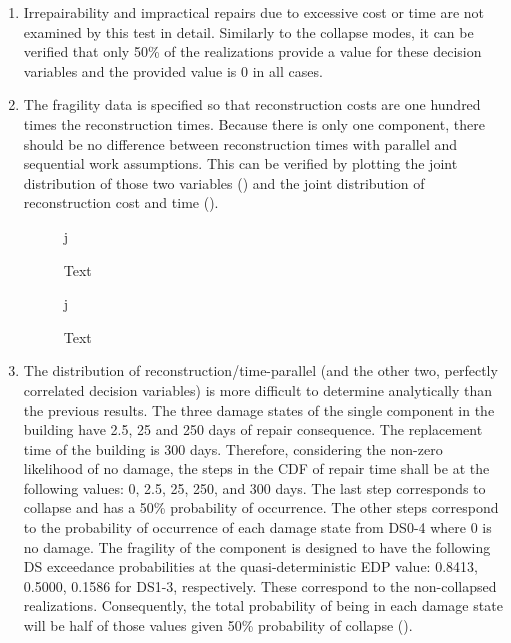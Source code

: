 \begin{enumerate}
    \item Irrepairability and impractical repairs due to excessive cost or time are not examined by this test in detail. Similarly to the collapse modes, it can be verified that only 50\% of the realizations provide a value for these decision variables and the provided value is 0 in all cases.
    \item The fragility data is specified so that reconstruction costs are one hundred times the reconstruction times. Because there is only one component, there should be no difference between reconstruction times with parallel and sequential work assumptions. This can be verified by plotting the joint distribution of those two variables () and the joint distribution of reconstruction cost and time ().
    
\begin{figure}[!htbp]j
  \caption{Text}
  \label{fig:ver_1_8}
\end{figure}

\begin{figure}[!htbp]j
  \caption{Text}
  \label{fig:ver_1_9}
\end{figure}

    \item The distribution of reconstruction/time-parallel (and the other two, perfectly correlated decision variables) is more difficult to determine analytically than the previous results. The three damage states of the single component in the building have 2.5, 25 and 250 days of repair consequence. The replacement time of the building is 300 days. Therefore, considering the non-zero likelihood of no damage, the steps in the CDF of repair time shall be at the following values: 0, 2.5, 25, 250, and 300 days. The last step corresponds to collapse and has a 50\% probability of occurrence. The other steps correspond to the probability of occurrence of each damage state from DS0-4 where 0 is no damage. The fragility of the component is designed to have the following DS exceedance probabilities at the quasi-deterministic EDP value: 0.8413, 0.5000, 0.1586 for DS1-3, respectively. These correspond to the non-collapsed realizations. Consequently, the total probability of being in each damage state will be half of those values given 50\% probability of collapse ().
    

\end{enumerate}
